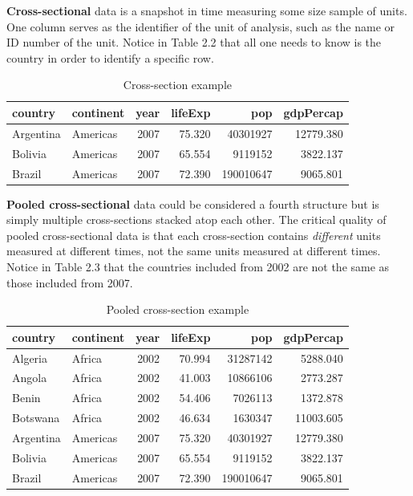 \documentclass[
]{book}
\begin{document}
\textbf{Cross-sectional} data is a snapshot in time measuring some size sample of units. One column serves as the identifier of the unit of analysis, such as the name or ID number of the unit. Notice in Table 2.2 that all one needs to know is the country in order to identify a specific row.

\begin{table}

\caption{\label{tab:cross-sec-fig}Cross-section example}
\centering
\begin{tabular}[t]{l|l|r|r|r|r}
\hline
country & continent & year & lifeExp & pop & gdpPercap\\
\hline
Argentina & Americas & 2007 & 75.320 & 40301927 & 12779.380\\
\hline
Bolivia & Americas & 2007 & 65.554 & 9119152 & 3822.137\\
\hline
Brazil & Americas & 2007 & 72.390 & 190010647 & 9065.801\\
\hline
\end{tabular}
\end{table}

\textbf{Pooled cross-sectional} data could be considered a fourth structure but is simply multiple cross-sections stacked atop each other. The critical quality of pooled cross-sectional data is that each cross-section contains \emph{different} units measured at different times, not the same units measured at different times. Notice in Table 2.3 that the countries included from 2002 are not the same as those included from 2007.

\begin{table}

\caption{\label{tab:pooled}Pooled cross-section example}
\centering
\begin{tabular}[t]{l|l|r|r|r|r}
\hline
country & continent & year & lifeExp & pop & gdpPercap\\
\hline
Algeria & Africa & 2002 & 70.994 & 31287142 & 5288.040\\
\hline
Angola & Africa & 2002 & 41.003 & 10866106 & 2773.287\\
\hline
Benin & Africa & 2002 & 54.406 & 7026113 & 1372.878\\
\hline
Botswana & Africa & 2002 & 46.634 & 1630347 & 11003.605\\
\hline
Argentina & Americas & 2007 & 75.320 & 40301927 & 12779.380\\
\hline
Bolivia & Americas & 2007 & 65.554 & 9119152 & 3822.137\\
\hline
Brazil & Americas & 2007 & 72.390 & 190010647 & 9065.801\\
\hline
\end{tabular}
\end{table}
\end{document}
